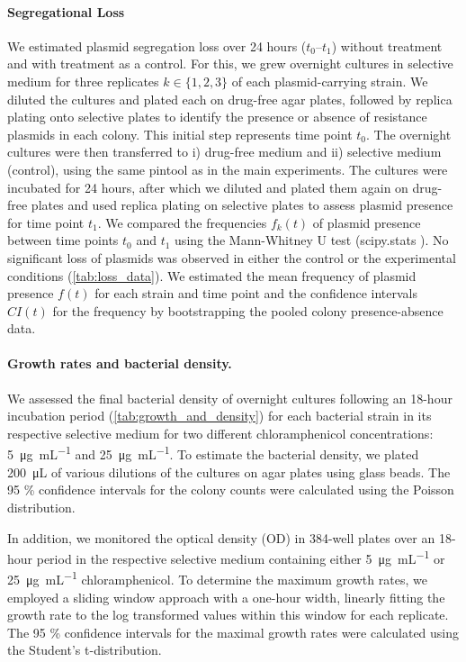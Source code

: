 \paragraph{Segregational Loss}
We estimated plasmid segregation loss over 24 hours ($t_0$--$t_1$) without treatment and with treatment as a control.
For this, we grew overnight cultures in selective medium for three replicates $k \in \{1, 2, 3\}$ of each plasmid-carrying strain.
We diluted the cultures and plated each on drug-free agar plates, followed by replica plating onto selective plates to identify the presence or absence of resistance plasmids in each colony.
This initial step represents time point $t_0$.
The overnight cultures were then transferred to i) drug-free medium and ii) selective medium (control), using the same pintool as in the main experiments.
The cultures were incubated for 24 hours, after which we diluted and plated them again on drug-free plates and used replica plating on selective plates to assess plasmid presence for time point $t_1$.
We compared the frequencies $f_k(t)$ of plasmid presence between time points $t_0$ and $t_1$ using the Mann-Whitney U test (scipy.stats \cite{Virtanen2020}).
No significant loss of plasmids was observed in either the control or the experimental conditions (\autoref{tab:loss_data}).
We estimated the mean frequency of plasmid presence $f(t)$  for each strain and time point and the confidence intervals $CI(t)$ for the frequency by bootstrapping the pooled colony presence-absence data.

\paragraph{Growth rates and bacterial density.}
We assessed the final bacterial density of overnight cultures following an 18-hour incubation period (\autoref{tab:growth_and_density}) for each bacterial strain in its respective selective medium for two different chloramphenicol concentrations: \SI{5}{\micro\gram\per\milli\liter} and \SI{25}{\micro\gram\per\milli\liter}.
To estimate the bacterial density, we plated \SI{200}{\micro\liter} of various dilutions of the cultures on agar plates using glass beads.
The 95 \% confidence intervals for the colony counts were calculated using the Poisson distribution.

In addition, we monitored the optical density (OD) in 384-well plates over an 18-hour period in the respective selective medium containing either \SI{5}{\micro\gram\per\milli\liter} or \SI{25}{\micro\gram\per\milli\liter} chloramphenicol. To determine the maximum growth rates, we employed a sliding window approach with a one-hour width, linearly fitting the growth rate to the log transformed values within this window for each replicate.
The 95 \% confidence intervals for the maximal growth rates were calculated using the Student's t-distribution.

